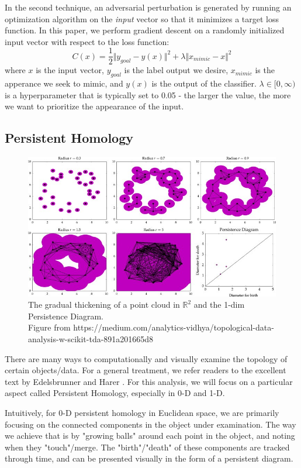 \documentclass[twoside,twocolumn]{article}
\begin{document}
In the second technique, an adversarial perturbation is generated by running an optimization algorithm on the \emph{input} vector so that it minimizes a target loss function. In this paper, we perform gradient descent on a randomly initialized input vector with respect to the loss function: 
$$
C(x) = \frac{1}{2} \Vert y_{goal} - y(x) \Vert^2
+ \lambda \Vert x_{mimic} - x \Vert^2
$$  
where $x$ is the input vector, $y_{goal}$ is the label output we desire, $x_{mimic}$ is the apperance we seek to mimic, and $y(x)$ is the output of the classifier. $\lambda \in [0,\infty)$ is a hyperparameter that is typically set to 0.05 - the larger the value, the more we want to prioritize the appearance of the input. 

\subsection{Persistent Homology}

\begin{figure}
    \centering
    \includegraphics[scale=0.55]{figures/pers_hom_example.jpg}
    \caption{The gradual thickening of a point cloud in $\mathbb{R}^2$ and the 1-dim Persistence Diagram. \\
    Figure from https://medium.com/analytics-vidhya/topological-data-analysis-w-scikit-tda-891a201665d8}
    \label{fig:pers_hom_example}
\end{figure}

There are many ways to computationally and visually examine the topology of certain objects/data. For a general treatment, we refer readers to the excellent text by Edelsbrunner and Harer \cite{edelsbrunnerharer}. For this analysis, we will focus on a particular aspect called Persistent Homology, especially in 0-D and 1-D. 

Intuitively, for 0-D persistent homology in Euclidean space, we are primarily focusing on the connected components in the object under examination. The way we achieve that is by "growing balls" around each point in the object, and noting when they "touch"/merge. The "birth"/"death" of these components are tracked through time, and can be presented visually in the form of a persistent diagram. 
\end{document}

